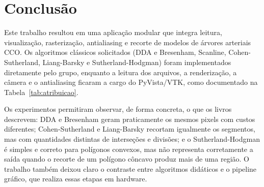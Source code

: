 \section{Conclusão}
Este trabalho resultou em uma aplicação modular que integra leitura, visualização, rasterização, antialiasing e recorte de modelos de árvores arteriais CCO. Os algoritmos clássicos solicitados (DDA e Bresenham, Scanline, Cohen-Sutherland, Liang-Barsky e Sutherland-Hodgman) foram implementados diretamente pelo grupo, enquanto a leitura dos arquivos, a renderização, a câmera e o antialiasing ficaram a cargo do PyVista/VTK, como documentado na Tabela~\ref{tab:atribuicao}.

Os experimentos permitiram observar, de forma concreta, o que os livros descrevem: DDA e Bresenham geram praticamente os mesmos pixels com custos diferentes; Cohen-Sutherland e Liang-Barsky recortam igualmente os segmentos, mas com quantidades distintas de interseções e divisões; e o Sutherland-Hodgman é simples e correto para polígonos convexos, mas não representa corretamente a saída quando o recorte de um polígono côncavo produz mais de uma região. O trabalho também deixou claro o contraste entre algoritmos didáticos e o pipeline gráfico, que realiza essas etapas em hardware.